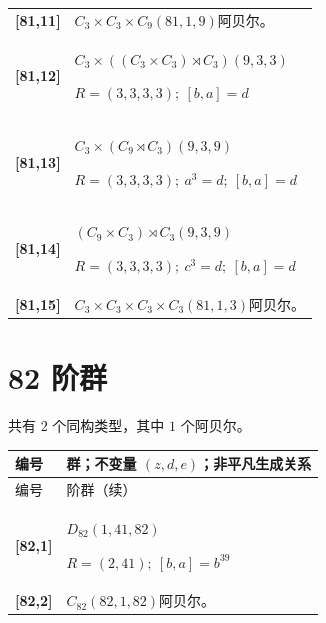 \documentclass[UTF8,fontset=fandol,11pt,a4paper]{ctexart}
\begin{document}
\begin{longtable}{@{}p{17mm}>{\raggedright\arraybackslash}p{141mm}@{}}
\textbf{[81,11]} & $C_{3}\times C_{3}\times C_{9}$\quad $(81,1,9)$\quad 阿贝尔。\\[3pt]

\textbf{[81,12]} & $C_{3}\times ((C_{3}\times C_{3})\rtimes C_{3})$\quad $(9,3,3)$\par\(R=(3,3,3,3);\allowbreak\ [b,a]=d\)\\[3pt]

\textbf{[81,13]} & $C_{3}\times (C_{9}\rtimes C_{3})$\quad $(9,3,9)$\par\(R=(3,3,3,3);\allowbreak\ a^{3}=d;\allowbreak\ [b,a]=d\)\\[3pt]

\textbf{[81,14]} & $(C_{9}\times C_{3})\rtimes C_{3}$\quad $(9,3,9)$\par\(R=(3,3,3,3);\allowbreak\ c^{3}=d;\allowbreak\ [b,a]=d\)\\[3pt]

\textbf{[81,15]} & $C_{3}\times C_{3}\times C_{3}\times C_{3}$\quad $(81,1,3)$\quad 阿贝尔。\\[3pt]

\end{longtable}\endgroup

\section*{82 阶群}\label{order:82}

共有 $2$ 个同构类型，其中 $1$ 个阿贝尔。

\begingroup\small\setlength{\tabcolsep}{3pt}\renewcommand{\arraystretch}{1.12}

\begin{longtable}{@{}p{17mm}>{\raggedright\arraybackslash}p{141mm}@{}}

\toprule 编号 & 群；不变量 $(z,d,e)$；非平凡生成关系\\\midrule\endfirsthead

\toprule 编号 & 82 阶群（续）\\\midrule\endhead\bottomrule\endfoot

\textbf{[82,1]} & $D_{82}$\quad $(1,41,82)$\par\(R=(2,41);\allowbreak\ [b,a]=b^{39}\)\\[3pt]

\textbf{[82,2]} & $C_{82}$\quad $(82,1,82)$\quad 阿贝尔。\\[3pt]

\end{longtable}\endgroup
\end{document}
